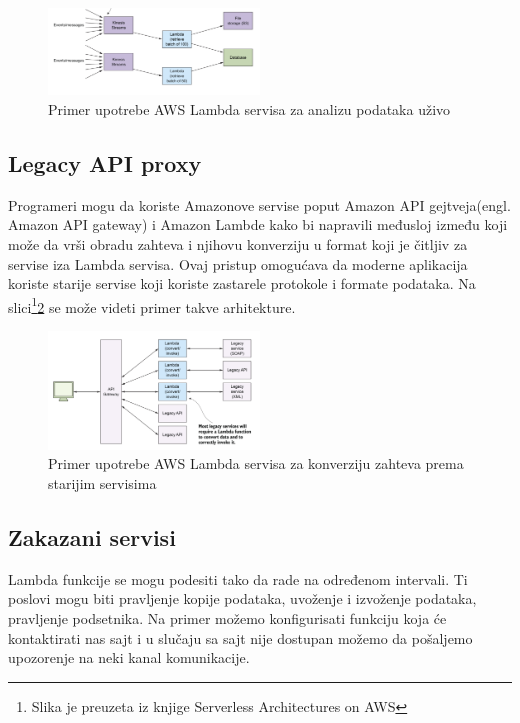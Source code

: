 \documentclass[12pt,oneside]{memoir}
\begin{document}
\begin{figure}[!ht]
  \centering
  \includegraphics[width=0.5\textwidth]{Slika 8.png}
  \caption{Primer upotrebe AWS Lambda servisa za analizu podataka uživo}
  \label{fig:AnalizaPodataka}
\end{figure}

\subsection{Legacy API proxy} %

Programeri mogu da koriste Amazonove servise poput Amazon API gejtveja(engl. Amazon API gateway) i Amazon Lambde kako bi napravili međusloj između koji može da vrši obradu zahteva i njihovu konverziju u format koji je čitljiv za servise iza Lambda servisa. Ovaj pristup omogućava da moderne aplikacija koriste starije servise koji koriste zastarele protokole i formate podataka. Na slici\footnote{Slika je preuzeta iz knjige Serverless Architectures on AWS}\ref{fig:KonverzijaPodataka} se može videti primer takve arhitekture.

\begin{figure}[!ht]
  \centering
  \includegraphics[width=0.5\textwidth]{Slika 9.png}
  \caption{Primer upotrebe AWS Lambda servisa za konverziju zahteva prema starijim servisima}
  \label{fig:KonverzijaPodataka}
\end{figure}

\subsection{Zakazani servisi}

Lambda funkcije se mogu podesiti tako da rade na određenom intervali. Ti poslovi mogu biti pravljenje kopije podataka, uvoženje i izvoženje podataka, pravljenje podsetnika. Na primer možemo konfigurisati funkciju koja će kontaktirati nas sajt i u slučaju sa sajt nije dostupan možemo da pošaljemo upozorenje na neki kanal komunikacije.
\end{document}
